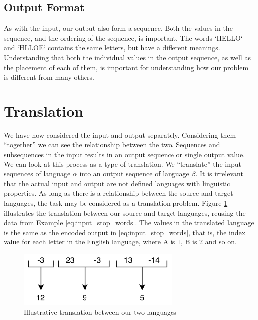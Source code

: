 \subsection{Output Format}
As with the input, our output also form a sequence. Both the values in the sequence, and the ordering of the sequence, is important. The words `HELLO` and `HLLOE` contains the same letters, but have a different meanings. Understanding that both the individual values in the output sequence, as well as the placement of each of them, is important for understanding how our problem is different from many others.


\section{Translation}
\label{sec:translation}
We have now considered the input and output separately. Considering them ``together'' we can see the relationship between the two. Sequences and subsequences in the input results in an output sequence or single output value. We can look at this process as a type of translation. We ``translate'' the input sequences of language \(\alpha\) into an output sequence of language \(\beta\). It is irrelevant that the actual input and output are not defined languages with linguistic properties. As long as there is a relationship between the source and target languages, the task may be considered as a translation problem. Figure \ref{fig:number_translation} illustrates the translation between our source and target languages, reusing the data from Example \ref{eq:input_stop_words}. The values in the translated language is the same as the encoded output in \ref{eq:input_stop_words}, that is, the index value for each letter in the English language, where A is 1, B is 2 and so on.

\begin{figure}[ht]
    \centering
    \includegraphics[width=0.7\textwidth]{fig/background_theory/number_translation.png}
    \caption{Illustrative translation between our two languages}
    \label{fig:number_translation}
\end{figure}

